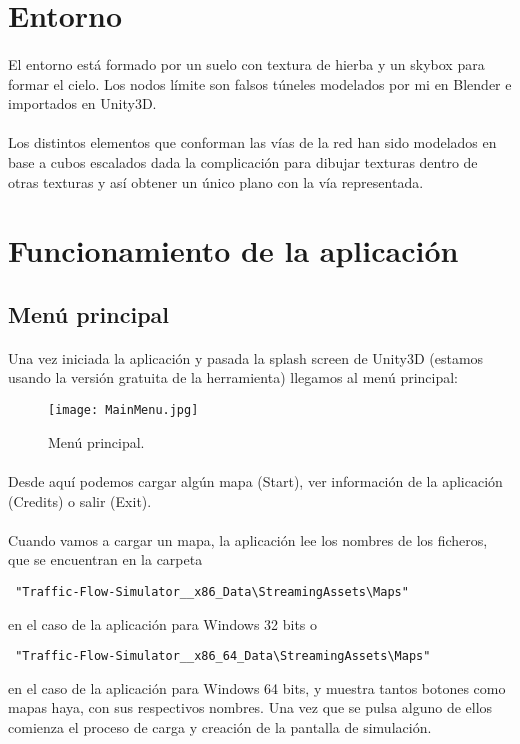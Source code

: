 \section{Entorno}

	\paragraph{}
	El entorno está formado por un suelo con textura de hierba y un skybox para formar el cielo. Los nodos límite son falsos túneles modelados por mi en Blender \cite{Blender_web} e importados en Unity3D.
	\paragraph{}
	Los distintos elementos que conforman las vías de la red han sido modelados en base a cubos escalados dada la complicación para dibujar texturas dentro de otras texturas y así obtener un único plano con la vía representada.
\newpage
\section{Funcionamiento de la aplicación}
	
	\subsection{Menú principal}
	\paragraph{}
	Una vez iniciada la aplicación y pasada la splash screen de Unity3D (estamos usando la versión gratuita de la herramienta) llegamos al menú principal:
	
	\begin{figure}[H]
		\centering
			\texttt{[image: MainMenu.jpg]}
	\caption{Menú principal.}
	\label{fig:MainMenu}
	\end{figure}
	
	\paragraph{}
	Desde aquí podemos cargar algún mapa (Start), ver información de la aplicación (Credits) o salir (Exit).

	\paragraph{}	
	Cuando vamos a cargar un mapa, la aplicación lee los nombres de los ficheros, que se encuentran en la carpeta
	\begin{verbatim} "Traffic-Flow-Simulator__x86_Data\StreamingAssets\Maps" \end{verbatim} en el caso de la aplicación para Windows 32 bits o 				\begin{verbatim} "Traffic-Flow-Simulator__x86_64_Data\StreamingAssets\Maps" \end{verbatim} en el caso de la aplicación para Windows 64 bits, y muestra tantos botones como mapas haya, con sus respectivos nombres. Una vez que se pulsa alguno de ellos comienza el proceso de carga y creación de la pantalla de simulación.
	
